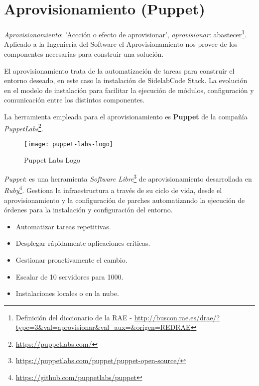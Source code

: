 


\section{Aprovisionamiento (Puppet)}
\label{sec:puppet}

\par \emph{Aprovisionamiento}: 'Accción o efecto de aprovisionar', \emph{aprovisionar}: abastecer\footnote{Definición del diccionario de la RAE - \url{http://buscon.rae.es/drae/?type=3&val=aprovisionar&val_aux=&origen=REDRAE}}. Aplicado a la Ingeniería del Software el Aprovisionamiento nos provee de los componentes necesarias para construir una solución.

\par El aprovisionamiento trata de la automatización de tareas para construir el entorno deseado, en este caso la instalación de SidelabCode Stack. La evolución en el modelo de instalación para facilitar la ejecución de módulos, configuración y comunicación entre los distintos componentes.

\par La herramienta empleada para el aprovisionamiento es \textbf{Puppet} de la compañía \emph{PuppetLabs}\footnote{\url{https://puppetlabs.com/}}.

\begin{figure}[H]
    \centering
    \texttt{[image: puppet-labs-logo]}
    \caption{Puppet Labs Logo}
    \label{fig:puppet-labs}
\end{figure}

\par \emph{Puppet}: es una herramienta \emph{Software Libre}\footnote{\url{https://puppetlabs.com/puppet/puppet-open-source/}} de aprovisionamiento desarrollada en \emph{Ruby}\footnote{\url{https://github.com/puppetlabs/puppet}}. Gestiona la infraestructura a través de su ciclo de vida, desde el aprovisionamiento y la configuración de parches automatizando la ejecución de órdenes para la instalación y configuración del entorno.

\begin{itemize}
	\item Automatizar tareas repetitivas.
	\item Desplegar rápidamente aplicaciones críticas.
	\item Gestionar proactivamente el cambio.
	\item Escalar de 10 servidores para 1000.
	\item Instalaciones locales o en la nube.
\end{itemize}

